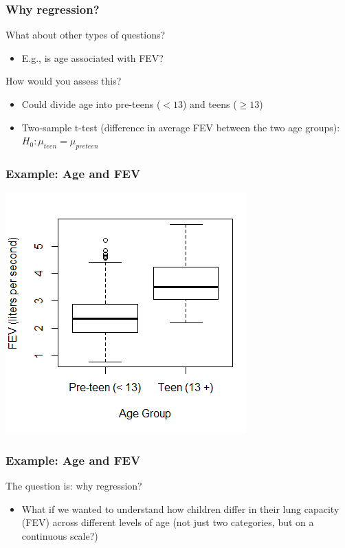 \documentclass[12pt, 
hyperref={colorlinks=true, linkcolor=blue, urlcolor=cyan}]{beamer}
\begin{document}
\begin{frame}
\frametitle{Why regression?} %
What about other types of questions?
\begin{itemize} 
\item E.g., is age associated with FEV?
\end{itemize}
How would you assess this?
\begin{itemize}
\item Could divide age into pre-teens ($< 13$) and teens ($\ge 13$) 
\item Two-sample t-test (difference in average FEV between the two age groups): $H_0: \mu_{teen} = \mu_{preteen}$
\end{itemize}
\end{frame}

\begin{frame}
\frametitle{Example: Age and FEV} %
\center \includegraphics[height=0.9\textheight]{./intro_boxplot} %
\end{frame}

\begin{frame}
\frametitle{Example: Age and FEV} %
The question is: why regression?
\begin{itemize}
\item What if we wanted to understand how children differ in their lung capacity (FEV) across different levels of age (not just two categories, but on a continuous scale?)
\end{itemize}
\end{frame}
\end{document}
